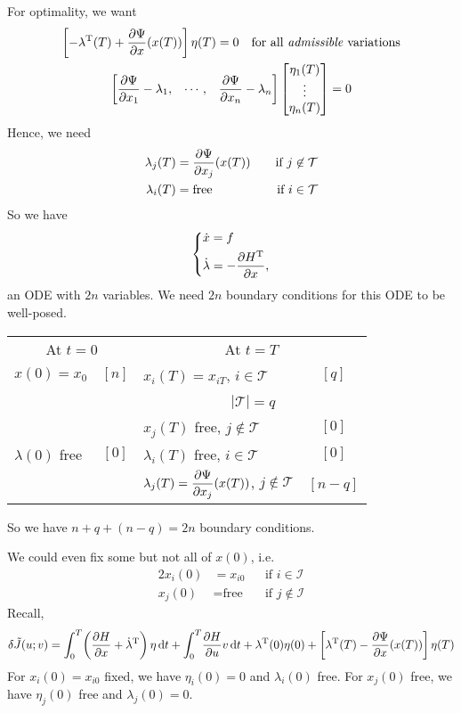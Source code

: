 For optimality, we want
\begin{gather}
  \left[ -\lambda^\text{T}(T) + \frac{\partial \Psi}{\partial x}(x(T)) \right] \eta(T) = 0 \quad \text{for all \emph{admissible} variations} \\
  \begin{bmatrix}
    \displaystyle \frac{\partial \Psi}{\partial x_1}-\lambda_1, & \cdots, & \displaystyle \frac{\partial \Psi}{\partial x_n}-\lambda_n
  \end{bmatrix}
  \begin{bmatrix}
    \eta_1(T) \\
    \vdots \\
    \eta_n(T)
  \end{bmatrix} = 0
\end{gather}
Hence, we need
\begin{alignat}{2}
  \lambda_j(T) &= \frac{\partial \Psi}{\partial x_j}(x(T)) \quad & \text{if } j\not\in\mathcal T \\
  \lambda_i(T) &= \text{free} & \text{if } i\in\mathcal T
\end{alignat}
So we have
\[ \begin{dcases}
    \dot x = f \\
    \dot\lambda = -\frac{\partial H^\text{T}}{\partial x},
  \end{dcases} \]
an ODE with $2n$ variables. We need $2n$ boundary conditions for this ODE to be well-posed.
\begin{center}
  \begin{tabular}{lclc}
    \toprule
    \multicolumn{2}{c}{At $t=0$} & \multicolumn{2}{c}{At $t=T$} \\
    \cmidrule(r){1-2} \cmidrule(l){3-4}
    $x(0)=x_0$ & $[n]$ & $x_i(T)=x_{iT}$, $i\in\mathcal T$ & $[q]$ \\
                                 && $\phantom{x_i(T)=x_{iT}}$ $|\mathcal T|=q$ \\
                                 && $x_j(T)$ free, $j\not\in\mathcal T$ & $[0]$ \\
    $\lambda(0)$ free & $[0]$ & $\lambda_i(T)$ free, $i\in\mathcal T$ & $[0]$ \\
                                 && $\lambda_j(T)=\displaystyle\frac{\partial \Psi}{\partial x_j}(x(T))$, $j\not\in\mathcal T$ & $[n-q]$ \\
    \bottomrule
  \end{tabular}
\end{center}
So we have $n+q+(n-q)=2n$ boundary conditions.

We could even fix some but not all of $x(0)$, i.e.
\begin{alignat}{2}
  x_i(0) &= x_{i0} & \text{if } i\in\mathcal I \\
  x_j(0) &= \text{free} \quad & \text{if } j\not\in\mathcal I
\end{alignat}
Recall,
\[
  \delta\tilde J(u;v) = \int_0^T\! \left(\frac{\partial H}{\partial x} + \dot\lambda^\text{T} \right)\eta\mathop{}\!\mathrm{d} t + \int_0^T\! \frac{\partial H}{\partial u} v \mathop{}\!\mathrm{d} t + \lambda^\text{T}(0)\eta(0) + \left[\lambda^\text{T}(T)-\frac{\partial \Psi}{\partial x}(x(T))\right] \eta(T)
\]
For $x_i(0)=x_{i0}$ fixed, we have $\eta_i(0)=0$ and $\lambda_i(0)$ free. For $x_j(0)$ free, we have $\eta_j(0)$ free and $\lambda_j(0)=0$.


